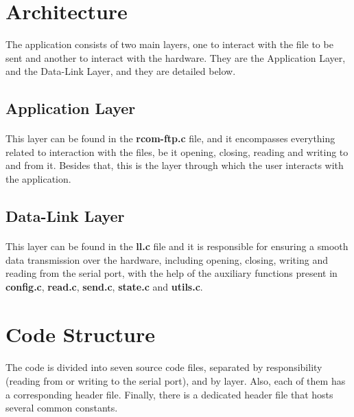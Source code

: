 \documentclass[11pt]{article}
\begin{document}
\section{Architecture}

The application consists of two main layers, one to interact with the file to be sent and another to interact with the hardware. They are the Application Layer, and the Data-Link Layer, and they are detailed below.

\subsection{Application Layer}

\paragraph{}This layer can be found in the \textbf{rcom-ftp.c} file, and it encompasses everything related to interaction with the files, be it opening, closing, reading and writing to and from it. Besides that, this is the layer through which the user interacts with the application.

\subsection{Data-Link Layer}

\paragraph{}This layer can be found in the \textbf{ll.c} file and it is responsible for ensuring a smooth data transmission over the hardware, including opening, closing, writing and reading from the serial port, with the help of the auxiliary functions present in \textbf{config.c}, \textbf{read.c}, \textbf{send.c}, \textbf{state.c} and \textbf{utils.c}.

\section{Code Structure}

\paragraph{}The code is divided into seven source code files, separated by responsibility (reading from or writing to the serial port), and by layer. Also, each of them has a corresponding header file. Finally, there is a dedicated header file that hosts several common constants.
\end{document}
